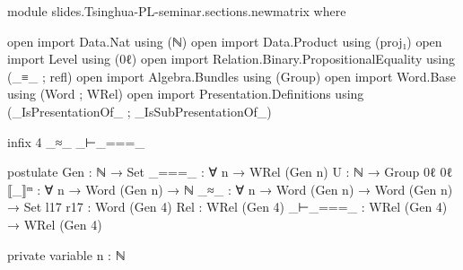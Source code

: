 \begin{code}[hide]
module slides.Tsinghua-PL-seminar.sections.newmatrix where

open import Data.Nat using (ℕ)
open import Data.Product using (proj₁)
open import Level using (0ℓ)
open import Relation.Binary.PropositionalEquality using (_≡_ ; refl)
open import Algebra.Bundles using (Group)
open import Word.Base using (Word ; WRel)
open import Presentation.Definitions using (_IsPresentationOf_ ; _IsSubPresentationOf_)

infix 4 _≈_ _⊢_===_

postulate
  Gen : ℕ → Set
  _===_ : ∀ {n} → WRel (Gen n)
  U : ℕ → Group 0ℓ 0ℓ
  ⟦_⟧ᵐ : ∀ {n} → Word (Gen n) → ℕ
  _≈_ : ∀ {n} → Word (Gen n) → Word (Gen n) → Set
  l17 r17 : Word (Gen 4)
  Rel : WRel (Gen 4)
  _⊢_===_ : WRel (Gen 4) → WRel (Gen 4)

private variable
  n : ℕ
\end{code}

